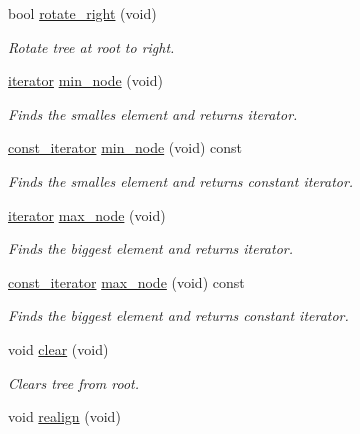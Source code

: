 \begin{DoxyCompactItemize}
bool \hyperlink{classcrap_1_1binary__tree_a91b08ff047413150fc0fb13a9c994692}{rotate\-\_\-right} (void)
\begin{DoxyCompactList}\small\item\em Rotate tree at root to right. \end{DoxyCompactList}\item 
\hyperlink{classcrap_1_1binary__tree_af3313f011a64bb5a945dcd39cc3fc3c3}{iterator} \hyperlink{classcrap_1_1binary__tree_abd56539e49ebf6b5fa346ebe5890187e}{min\-\_\-node} (void)
\begin{DoxyCompactList}\small\item\em Finds the smalles element and returns iterator. \end{DoxyCompactList}\item 
\hyperlink{classcrap_1_1binary__tree_aa9b9a8c0dd4bb6c574ea0526040e7c50}{const\-\_\-iterator} \hyperlink{classcrap_1_1binary__tree_afb187572916d545e6342951a2a69ddc2}{min\-\_\-node} (void) const 
\begin{DoxyCompactList}\small\item\em Finds the smalles element and returns constant iterator. \end{DoxyCompactList}\item 
\hyperlink{classcrap_1_1binary__tree_af3313f011a64bb5a945dcd39cc3fc3c3}{iterator} \hyperlink{classcrap_1_1binary__tree_aa635965ff3df0bad41210d1d366c56a1}{max\-\_\-node} (void)
\begin{DoxyCompactList}\small\item\em Finds the biggest element and returns iterator. \end{DoxyCompactList}\item 
\hyperlink{classcrap_1_1binary__tree_aa9b9a8c0dd4bb6c574ea0526040e7c50}{const\-\_\-iterator} \hyperlink{classcrap_1_1binary__tree_a840dfae55e9a1b61b0c21a4007eaef2b}{max\-\_\-node} (void) const 
\begin{DoxyCompactList}\small\item\em Finds the biggest element and returns constant iterator. \end{DoxyCompactList}\item 
void \hyperlink{classcrap_1_1binary__tree_a551ff89f9c1706ece5140b6d97601afb}{clear} (void)
\begin{DoxyCompactList}\small\item\em Clears tree from root. \end{DoxyCompactList}\item 
void \hyperlink{classcrap_1_1binary__tree_a5ce3ec6fcc6f10910da04b28e1283d81}{realign} (void)

\end{DoxyCompactItemize}
